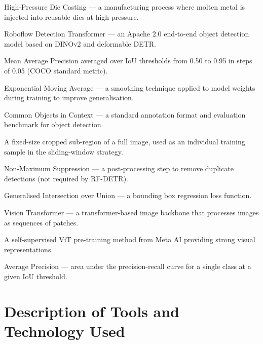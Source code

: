 \begin{description}[leftmargin=3cm, style=nextline]
    \item[HPDC] High-Pressure Die Casting --- a manufacturing process where molten metal is injected into reusable dies at high pressure.
    \item[RF-DETR] Roboflow Detection Transformer --- an Apache 2.0 end-to-end object detection model based on DINOv2 and deformable DETR.
    \item[mAP50-95] Mean Average Precision averaged over IoU thresholds from 0.50 to 0.95 in steps of 0.05 (COCO standard metric).
    \item[EMA] Exponential Moving Average --- a smoothing technique applied to model weights during training to improve generalisation.
    \item[COCO] Common Objects in Context --- a standard annotation format and evaluation benchmark for object detection.
    \item[Patch] A fixed-size cropped sub-region of a full image, used as an individual training sample in the sliding-window strategy.
    \item[NMS] Non-Maximum Suppression --- a post-processing step to remove duplicate detections (not required by RF-DETR).
    \item[GIoU] Generalised Intersection over Union --- a bounding box regression loss function.
    \item[ViT] Vision Transformer --- a transformer-based image backbone that processes images as sequences of patches.
    \item[DINOv2] A self-supervised ViT pre-training method from Meta AI providing strong visual representations.
    \item[AP] Average Precision --- area under the precision-recall curve for a single class at a given IoU threshold.
\end{description}

\section{Description of Tools and Technology Used}
\justify

